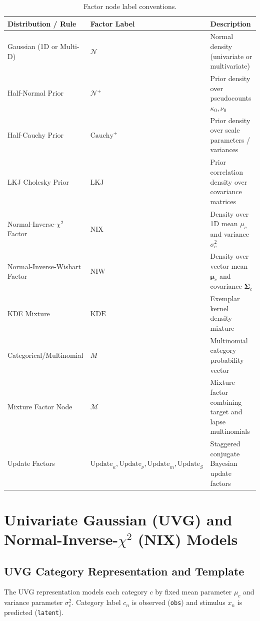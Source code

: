 \documentclass[11pt]{report}
\begin{document}
\begin{table}[h!]
\centering
\begin{tabular}{lll}
\hline
\textbf{Distribution / Rule} & \textbf{Factor Label} & \textbf{Description} \\
\hline
Gaussian (1D or Multi-D) & $\mathcal{N}$ & Normal density (univariate or multivariate) \\
Half-Normal Prior & $\mathcal{N}^+$ & Prior density over pseudocounts $\kappa_0, \nu_0$ \\
Half-Cauchy Prior & $\text{Cauchy}^+$ & Prior density over scale parameters / variances \\
LKJ Cholesky Prior & $\text{LKJ}$ & Prior correlation density over covariance matrices \\
Normal-Inverse-$\chi^2$ Factor & $\text{NIX}$ & Density over 1D mean $\mu_c$ and variance $\sigma^2_c$ \\
Normal-Inverse-Wishart Factor & $\text{NIW}$ & Density over vector mean $\boldsymbol{\mu}_c$ and covariance $\boldsymbol{\Sigma}_c$ \\
KDE Mixture & $\text{KDE}$ & Exemplar kernel density mixture \\
Categorical/Multinomial & $M$ & Multinomial category probability vector \\
Mixture Factor Node & $\mathcal{M}$ & Mixture factor combining target and lapse multinomials \\
Update Factors & $\text{Update}_\kappa, \text{Update}_\nu, \text{Update}_m, \text{Update}_S$ & Staggered conjugate Bayesian update factors \\
\hline
\end{tabular}
\caption{Factor node label conventions.}
\label{tab:factor_labels}
\end{table}

\newpage

\chapter{Univariate Gaussian (UVG) and Normal-Inverse-$\chi^2$ (NIX) Models}

\section{UVG Category Representation and Template}

The UVG representation models each category $c$ by fixed mean parameter $\mu_c$ and variance parameter $\sigma^2_c$. Category label $c_n$ is observed (\texttt{obs}) and stimulus $x_n$ is predicted (\texttt{latent}).
\end{document}
